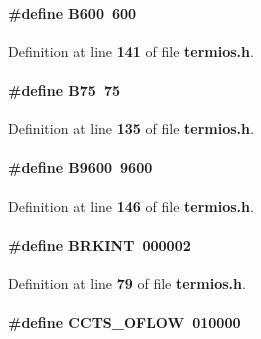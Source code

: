 \paragraph[{B600}]{\setlength{\rightskip}{0pt plus 5cm}\#define B600~600}\label{termios_8h_a4a0fb8730fc62c93222bdcfead0685e7}


Definition at line {\bf 141} of file {\bf termios.\+h}.

\paragraph[{B75}]{\setlength{\rightskip}{0pt plus 5cm}\#define B75~75}\label{termios_8h_a6c7fd334abc19a56421e4cabaeb9fe0f}


Definition at line {\bf 135} of file {\bf termios.\+h}.

\paragraph[{B9600}]{\setlength{\rightskip}{0pt plus 5cm}\#define B9600~9600}\label{termios_8h_ad0539916b8412eb7ddfb9ae02aff0853}


Definition at line {\bf 146} of file {\bf termios.\+h}.

\paragraph[{B\+R\+K\+I\+NT}]{\setlength{\rightskip}{0pt plus 5cm}\#define B\+R\+K\+I\+NT~000002}\label{termios_8h_a51f85744efb808bc7cdfc9bf689cb043}


Definition at line {\bf 79} of file {\bf termios.\+h}.

\paragraph[{C\+C\+T\+S\+\_\+\+O\+F\+L\+OW}]{\setlength{\rightskip}{0pt plus 5cm}\#define C\+C\+T\+S\+\_\+\+O\+F\+L\+OW~010000}\label{termios_8h_af75fe53eb831d0cfea3101b6787499ea}


